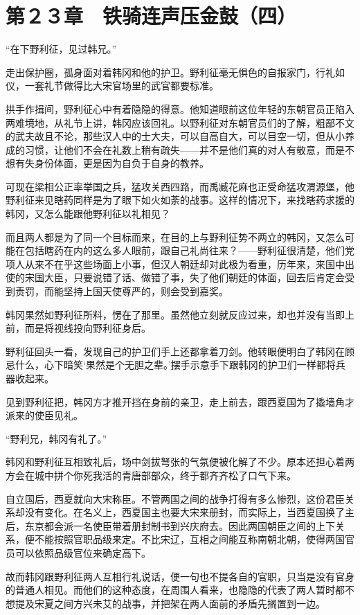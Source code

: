 \section{第２３章　铁骑连声压金鼓（四）}

“在下野利征，见过韩兄。”

走出保护圈，孤身面对着韩冈和他的护卫。野利征毫无惧色的自报家门，行礼如仪，一套礼节做得比大宋官场里的武官都要标准。

拱手作揖间，野利征心中有着隐隐的得意。他知道眼前这位年轻的东朝官员正陷入两难境地，从礼节上讲，韩冈应该回礼。以野利征对东朝官员们的了解，粗鄙不文的武夫故且不论，那些汉人中的士大夫，可以自高自大，可以目空一切，但从小养成的习惯，让他们不会在礼数上稍有疏失——并不是他们真的对人有敬意，而是不想有失身份体面，更是因为自负于自身的教养。

可现在梁相公正率举国之兵，猛攻关西四路，而禹臧花麻也正受命猛攻渭源堡，他野利征来见瞎药同样是为了眼下如火如荼的战事。这样的情况下，来找瞎药求援的韩冈，又怎么能跟他野利征以礼相见？

而且两人都是为了同一个目标而来，在目的上与野利征势不两立的韩冈，又怎么可能在包括瞎药在内的这么多人眼前，跟自己礼尚往来？——野利征很清楚，他们党项人从来不在乎这些场面上小事，但汉人朝廷却对此极为看重，历年来，来国中出使的宋国大臣，只要说错了话、做错了事，失了他们朝廷的体面，回去后肯定会受到责罚，而能坚持上国天使尊严的，则会受到嘉奖。

韩冈果然如野利征所料，愣在了那里。虽然他立刻就反应过来，却也并没有当即上前，而是将视线投向野利征身后。

野利征回头一看，发现自己的护卫们手上还都拿着刀剑。他转眼便明白了韩冈在顾忌什么，心下暗笑‘果然是个无胆之辈。’摆手示意手下跟韩冈的护卫们一样都将兵器收起来。

见到野利征把，韩冈方才推开挡在身前的亲卫，走上前去，跟西夏国为了撬墙角才派来的使臣见礼。

“野利兄，韩冈有礼了。”

韩冈和野利征互相致礼后，场中剑拔弩张的气氛便被化解了不少。原本还担心着两方会在城中拼个你死我活的青唐部部众，终于都齐齐松了口气下来。

自立国后，西夏就向大宋称臣。不管两国之间的战争打得有多么惨烈，这份君臣关系却没有变化。在名义上，西夏国主也要大宋来册封，而实际上，当西夏国换了主后，东京都会派一名使臣带着册封制书到兴庆府去。因此两国朝臣之间的上下关系，便不能按照官职品级来定。不比宋辽，互相之间能互称南朝北朝，使得两国官员可以依照品级官位来确定高下。

故而韩冈跟野利征两人互相行礼说话，便一句也不提各自的官职，只当是没有官身的普通人相见。而他们的这种态度，在周围人看来，也隐隐的代表了两人暂时都不想提及宋夏之间方兴未艾的战事，并把架在两人面前的矛盾先搁置到一边。

